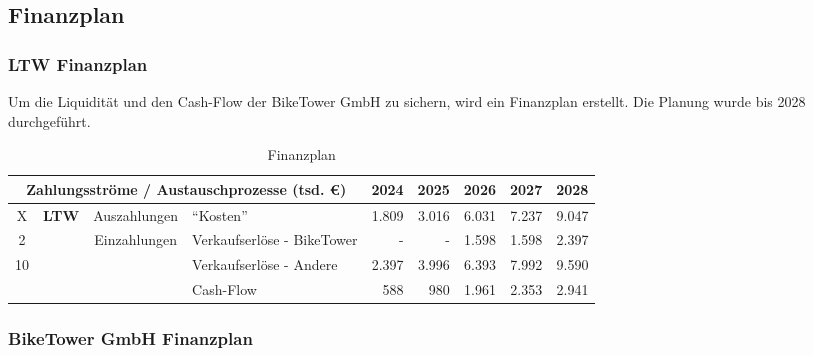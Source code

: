 \subsection{Finanzplan}

\subsubsection{LTW Finanzplan}

Um die Liquidität und den Cash-Flow der BikeTower GmbH zu sichern, wird ein Finanzplan erstellt. Die Planung wurde bis 2028 durchgeführt.

\begin{table}[H]
    \small
    \centering
    \begin{tabular}{ccclrrrrr}
        \toprule
        \multicolumn{4}{c}{\textbf{Zahlungsströme / Austauschprozesse} (tsd. \euro{})} & \textbf{2024}                 & \textbf{2025}                 & \textbf{2026}              & \textbf{2027} & \textbf{2028}                         \\
        \midrule
        X                                                                              & \multirow{3}{*}{\textbf{LTW}} & Auszahlungen                  & \enquote{Kosten}           & 1.809         & 3.016         & 6.031 & 7.237 & 9.047 \\
        2                                                                              &                               & \multirow{2}{*}{Einzahlungen} & Verkaufserlöse - BikeTower & -             & -             & 1.598 & 1.598 & 2.397 \\
        10                                                                             &                               &                               & Verkaufserlöse - Andere    & 2.397         & 3.996         & 6.393 & 7.992 & 9.590 \\
        \midrule
                                                                                       &                               &                               & Cash-Flow                  & 588           & 980           & 1.961 & 2.353 & 2.941 \\

        \bottomrule
    \end{tabular}
    \caption{Finanzplan}
    \label{tab:finanzplan}
\end{table}

\clearpage
\subsubsection{BikeTower GmbH Finanzplan}

